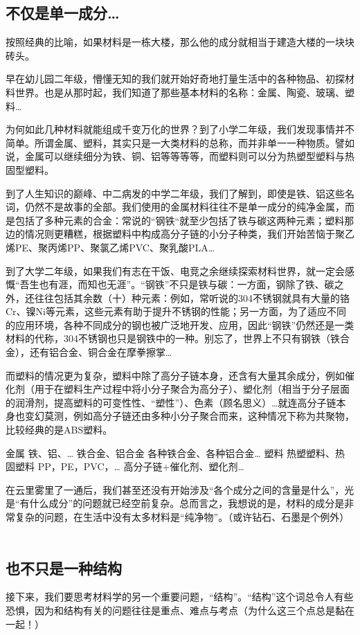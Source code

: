 

\subsection{不仅是单一成分…}
按照经典的比喻，如果材料是一栋大楼，那么他的成分就相当于建造大楼的一块块砖头。

早在幼儿园二年级，懵懂无知的我们就开始好奇地打量生活中的各种物品、初探材料世界。也是从那时起，我们知道了那些基本材料的名称：金属、陶瓷、玻璃、塑料…

为何如此几种材料就能组成千变万化的世界？到了小学二年级，我们发现事情并不简单。所谓金属、塑料，其实只是一大类材料的总称，而并非单一一种物质。譬如说，金属可以继续细分为铁、铜、铝等等等等，而塑料则可以分为热塑型塑料与热固型塑料。

到了人生知识的巅峰、中二病发的中学二年级，我们了解到，即使是铁、铝这些名词，仍然不是故事的全部。我们使用的金属材料往往不是单一成分的纯净金属，而是包括了多种元素的合金：常说的“钢铁“就至少包括了铁与碳这两种元素；塑料那边的情况则更糟糕，根据塑料中构成高分子链的小分子种类，我们开始苦恼于聚乙烯PE、聚丙烯PP、聚氯乙烯PVC、聚乳酸PLA…

到了大学二年级，如果我们有志在干饭、电竞之余继续探索材料世界，就一定会感慨“吾生也有涯，而知也无涯”。“钢铁”不只是铁与碳：一方面，钢除了铁、碳之外，还往往包括其余数（十）种元素：例如，常听说的304不锈钢就具有大量的铬Cr、镍Ni等元素，这些元素有助于提升不锈钢的性能；另一方面，为了适应不同的应用环境，各种不同成分的钢也被广泛地开发、应用，因此“钢铁”仍然还是一类材料的代称，304不锈钢也只是钢铁中的一种。别忘了，世界上不只有钢铁（铁合金），还有铝合金、铜合金在摩拳擦掌…

而塑料的情况更为复杂，塑料中除了高分子链本身，还含有大量其余成分，例如催化剂（用于在塑料生产过程中将小分子聚合为高分子）、塑化剂（相当于分子层面的润滑剂，提高塑料的可变性性、“塑性”）、色素（顾名思义）…就连高分子链本身也变幻莫测，例如高分子链还由多种小分子聚合而来，这种情况下称为共聚物，比较经典的是ABS塑料。

金属	铁、铝、…	铁合金、铝合金	各种铁合金、各种铝合金…
塑料	热塑塑料、热固塑料	PP，PE，PVC，…	高分子链+催化剂、塑化剂…

在云里雾里了一通后，我们甚至还没有开始涉及“各个成分之间的含量是什么”，光是“有什么成分”的问题就已经空前复杂。总而言之，我想说的是，材料的成分是非常复杂的问题，在生活中没有太多材料是“纯净物”。（或许钻石、石墨是个例外）
 
\subsection{也不只是一种结构}
接下来，我们要思考材料学的另一个重要问题，“结构”。“结构”这个词总令人有些恐惧，因为和结构有关的问题往往是重点、难点与考点（为什么这三个点总是黏在一起！）

